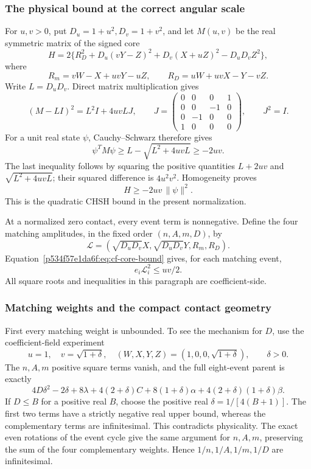 \subsubsection*{The physical bound at the correct angular scale}
For \(u,v>0\), put \(D_u=1+u^2,D_v=1+v^2\), and let \(M(u,v)\) be the
real symmetric matrix of the signed core
\[
H=2\{R_D^2+D_u(vY-Z)^2+D_v(X+uZ)^2-D_uD_vZ^2\},
\]
where
\[
R_m=vW-X+uvY-uZ,\qquad R_D=uW+uvX-Y-vZ.
\]
Write \(L=D_uD_v\). Direct matrix multiplication gives
\begin{equation}
(M-LI)^2=L^2I+4uvLJ,\qquad
J=\begin{pmatrix}0&0&0&1\\0&0&-1&0\\0&-1&0&0\\1&0&0&0\end{pmatrix},
\qquad J^2=I.                                      \label{p534f57e1da6f:eq:cf-core-square}
\end{equation}
For a unit real state \(\psi\), Cauchy--Schwarz therefore gives
\[
\psi^TM\psi\ge L-\sqrt{L^2+4uvL}\ge-2uv.
\]
The last inequality follows by squaring the positive quantities
\(L+2uv\) and \(\sqrt{L^2+4uvL}\); their squared difference is
\(4u^2v^2\). Homogeneity proves
\begin{equation}
                         H\ge-2uv\,\|\psi\|^2.        \label{p534f57e1da6f:eq:cf-core-bound}
\end{equation}
This is the quadratic CHSH bound in the present normalization.

At a normalized zero contact, every event term is nonnegative. Define
the four matching amplitudes, in the fixed order \((n,A,m,D)\), by
\[
\mathcal L=(\sqrt{D_uD_v}X,\sqrt{D_uD_v}Y,R_m,R_D).
\]
Equation~\eqref{p534f57e1da6f:eq:cf-core-bound} gives, for each matching event,
\begin{equation}
                   e_i\mathcal L_i^2\le uv/2.         \label{p534f57e1da6f:eq:cf-amplitude-bound}
\end{equation}
All square roots and inequalities in this paragraph are coefficient-side.

\subsubsection*{Matching weights and the compact contact geometry}
First every matching weight is unbounded. To see the mechanism for
\(D\), use the coefficient-field experiment
\[
 u=1,\quad v=\sqrt{1+\delta},\quad
 (W,X,Y,Z)=(1,0,0,\sqrt{1+\delta}),\qquad\delta>0.
\]
The \(n,A,m\) positive square terms vanish, and the full eight-event parent is exactly
\[
4D\delta^2-2\delta+8\lambda+4(2+\delta)C
 +8(1+\delta)\alpha+4(2+\delta)(1+\delta)\beta.
\]
If \(D\le B\) for a positive real \(B\), choose the positive real
\(\delta=1/[4(B+1)]\). The first two terms have a strictly negative
real upper bound, whereas the complementary terms are infinitesimal.
This contradicts physicality. The exact even rotations of the event
cycle give the same argument for \(n,A,m\), preserving the sum of the
four complementary weights.  Hence \(1/n,1/A,1/m,1/D\) are infinitesimal.

